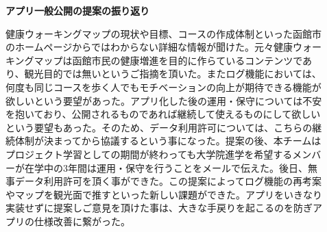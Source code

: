 ﻿\begin{description}

 \item[]
  \textbf{アプリ一般公開の提案の振り返り}\par
 健康ウォーキングマップの現状や目標、コースの作成体制といった函館市のホームページからではわからない詳細な情報が聞けた。元々健康ウォーキングマップは函館市民の健康増進を目的に作らているコンテンツであり、観光目的では無いというご指摘を頂いた。またログ機能においては、何度も同じコースを歩く人でもモチベーションの向上が期待できる機能が欲しいという要望があった。アプリ化した後の運用・保守については不安を抱いており、公開されるものであれば継続して使えるものにして欲しいという要望もあった。そのため、データ利用許可については、こちらの継続体制が決まってから協議するという事になった。提案の後、本チームはプロジェクト学習としての期間が終わっても大学院進学を希望するメンバーが在学中の3年間は運用・保守を行うことをメールで伝えた。後日、無事データ利用許可を頂く事ができた。この提案によってログ機能の再考案やマップを観光面で推すといった新しい課題ができた。アプリをいきなり実装せずに提案しご意見を頂けた事は、大きな手戻りを起こるのを防ぎアプリの仕様改善に繋がった。

  \par
\end{description}
